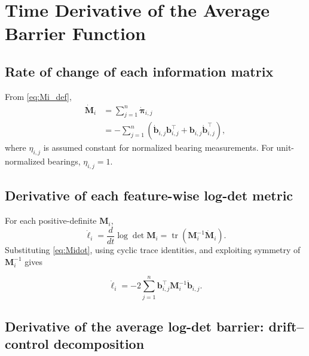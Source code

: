 \documentclass[11pt,a4paper]{article}
\newcommand{\Tr}{\operatorname{tr}}
\begin{document}
\section{Time Derivative of the Average Barrier Function}
\label{sec:hdot}

\subsection{Rate of change of each information matrix}

From \eqref{eq:Mi_def},
\begin{align}
  \dot{\bm{M}}_{i}
  &= \sum_{j=1}^{n}\dot{\bm{\pi}}_{i,j} \\
  &= -\sum_{j=1}^{n}
  \left(\dot{\bm{b}}_{i,j}\bm{b}_{i,j}^{\top}
  + \bm{b}_{i,j}\dot{\bm{b}}_{i,j}^{\top}\right),
  \label{eq:Midot}
\end{align}
where $\eta_{i,j}$ is assumed constant for normalized bearing measurements.
For unit-normalized bearings, $\eta_{i,j}=1$.

\subsection{Derivative of each feature-wise log-det metric}

For each positive-definite $\bm{M}_{i}$,
\begin{equation}
  \dot{\ell}_{i}
  = \frac{d}{dt}\log\det\bm{M}_{i}
  = \Tr\left(\bm{M}_{i}^{-1}\dot{\bm{M}}_{i}\right).
\end{equation}
Substituting \eqref{eq:Midot}, using cyclic trace identities, and exploiting
symmetry of $\bm{M}_{i}^{-1}$ gives
\begin{resultbox}
\begin{equation}
  \boxed{
  \dot{\ell}_{i}
  = -2\sum_{j=1}^{n}
  \bm{b}_{i,j}^{\top}\bm{M}_{i}^{-1}\dot{\bm{b}}_{i,j}.}
  \label{eq:ellidot_compact}
\end{equation}
\end{resultbox}

\subsection{Derivative of the average log-det barrier:
drift--control decomposition}
\end{document}
